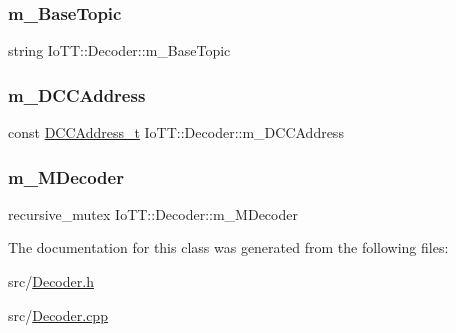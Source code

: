 \subsubsection{\texorpdfstring{m\+\_\+\+Base\+Topic}{m\_BaseTopic}}
{\footnotesize\ttfamily string Io\+T\+T\+::\+Decoder\+::m\+\_\+\+Base\+Topic\hspace{0.3cm}{\ttfamily [protected]}}

\mbox{\label{classIoTT_1_1Decoder_a6003d2a748d7b408285198d0bef0ed8d}} 
\subsubsection{\texorpdfstring{m\+\_\+\+D\+C\+C\+Address}{m\_DCCAddress}}
{\footnotesize\ttfamily const \hyperlink{namespaceIoTT_a31b8cd9473fc447b3fb341b78afa54fe}{D\+C\+C\+Address\+\_\+t} Io\+T\+T\+::\+Decoder\+::m\+\_\+\+D\+C\+C\+Address\hspace{0.3cm}{\ttfamily [protected]}}

\mbox{\label{classIoTT_1_1Decoder_a2848111b5585ea86a9b7313f681759c7}} 
\subsubsection{\texorpdfstring{m\+\_\+\+M\+Decoder}{m\_MDecoder}}
{\footnotesize\ttfamily recursive\+\_\+mutex Io\+T\+T\+::\+Decoder\+::m\+\_\+\+M\+Decoder\hspace{0.3cm}{\ttfamily [protected]}}



The documentation for this class was generated from the following files\+:\begin{DoxyCompactItemize}
\item 
src/\hyperlink{Decoder_8h}{Decoder.\+h}\item 
src/\hyperlink{Decoder_8cpp}{Decoder.\+cpp}\end{DoxyCompactItemize}
